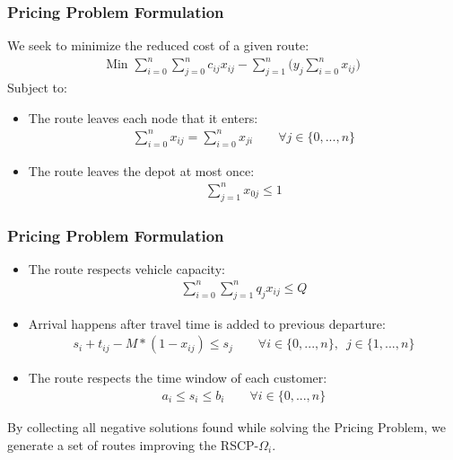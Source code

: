 \documentclass{beamer}
\begin{document}
	\begin{frame}[t]
		\frametitle{Pricing Problem Formulation}
		\small
		\vspace{-.25cm}
		We seek to minimize the reduced cost of a given route:
		\begin{align*}
			\text{Min } \sum_{i = 0}^{n}{\sum_{j = 0}^{n}{c_{ij}x_{ij}}} - \sum_{j = 1}^{n} \Bigg( y_j \sum_{i = 0}^{n} x_{ij} \Bigg)
		\end{align*}
		Subject to:
		\begin{itemize}
			\item The route leaves each node that it enters:
			\begin{align}
				\sum_{i = 0}^{n}{x_{ij}} = \sum_{i = 0}^{n}{x_{ji}} \qquad \forall j \in \{0,...,n\} \label{c:leave_customer_pricing}
			\end{align}
			\item The route leaves the depot at most once:
			\begin{align}
				\sum_{j = 1}^{n}{x_{0j}} \leq 1 \label{c:leave_depot_pricing}
			\end{align}
		\end{itemize}
		\normalsize
	\end{frame}

	\begin{frame}[t]
		\frametitle{Pricing Problem Formulation}
		\small
		\vspace{-.25cm}
		\begin{itemize}
			\item The route respects vehicle capacity:
			\begin{align}
				\sum_{i = 0}^{n}{\sum_{j = 1}^{n}{q_{j} x_{ij}}} \leq Q \label{c:capacity_pricing}
			\end{align}
			\item Arrival happens after travel time is added to previous departure:
			\begin{align}
				s_i + t_{ij} - M * (1 - x_{ij}) \leq s_j \qquad \forall i \in \{0,...,n\}, \enspace j \in \{1,...,n\} \label{c:travel_times_pricing}
			\end{align}
			\item The route respects the time window of each customer:
			\begin{align}
				a_i \leq s_i \leq b_i \qquad \forall i \in \{0,...,n\} \label{c:time_window_pricing}
			\end{align}
		\end{itemize}
		\vspace{.5cm}
		\begin{block}{}
			By collecting all negative solutions found while solving the Pricing Problem, we generate a set of routes improving the RSCP-$ \Omega_i $.
		\end{block}
		\normalsize
	\end{frame}
\end{document}
